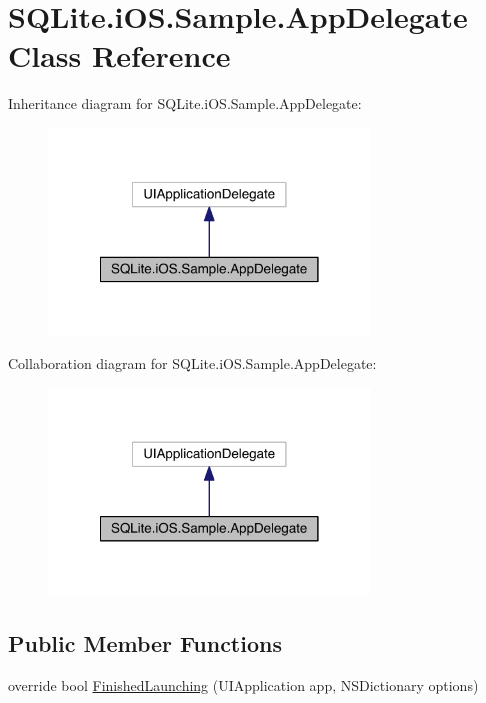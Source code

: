 \hypertarget{class_s_q_lite_1_1i_o_s_1_1_sample_1_1_app_delegate}{\section{S\+Q\+Lite.\+i\+O\+S.\+Sample.\+App\+Delegate Class Reference}
\label{class_s_q_lite_1_1i_o_s_1_1_sample_1_1_app_delegate}
}


Inheritance diagram for S\+Q\+Lite.\+i\+O\+S.\+Sample.\+App\+Delegate\+:
\nopagebreak
\begin{figure}[H]
\begin{center}
\leavevmode
\includegraphics[width=242pt]{class_s_q_lite_1_1i_o_s_1_1_sample_1_1_app_delegate__inherit__graph}
\end{center}
\end{figure}


Collaboration diagram for S\+Q\+Lite.\+i\+O\+S.\+Sample.\+App\+Delegate\+:
\nopagebreak
\begin{figure}[H]
\begin{center}
\leavevmode
\includegraphics[width=242pt]{class_s_q_lite_1_1i_o_s_1_1_sample_1_1_app_delegate__coll__graph}
\end{center}
\end{figure}
\subsection*{Public Member Functions}
\begin{DoxyCompactItemize}
\item 
override bool \hyperlink{class_s_q_lite_1_1i_o_s_1_1_sample_1_1_app_delegate_acc03e5730a814a9d60a1896718545661}{Finished\+Launching} (U\+I\+Application app, N\+S\+Dictionary options)
\end{DoxyCompactItemize}
